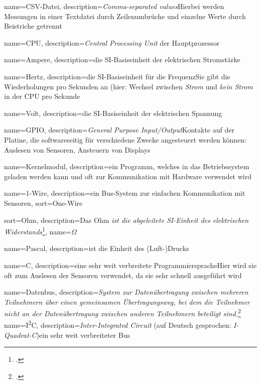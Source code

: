 {
  name=CSV-Datei,
  description={\textit{Comma-separated values}\newline Hierbei werden Messungen in einer Textdatei durch Zeilenumbrüche und einzelne Werte durch Beistriche getrennt}
}

{
  name=CPU,
  description={\textit{Central Processing Unit}\newline
  	der Hauptprozessor}
}

{
  name=Ampere,
  description={die SI-Basiseinheit der elektrischen Stromstärke}
}

{
  name=Hertz,
  description={die SI-Basiseinheit für die Frequenz\newline Sie gibt die Wiederholungen pro Sekunden an (hier: Wechsel zwischen \emph{Strom} und \emph{kein Strom} in der \gls{CPU} pro Sekunde}
}

{
  name=Volt,
  description={die SI-Basiseinheit der elektrischen Spannung}
}

{
  name=GPIO,
  description={\emph{General Purpose Input/Output}\newline Kontakte auf der Platine, die softwareseitig für verschiedene Zwecke angesteuert werden können\newline \zB: Auslesen von Sensoren, Ansteuern von Displays}
}

{
  name=Kernelmodul,
  description={ein Programm, welches in das Betriebssystem geladen werden kann und oft zur Kommunikation mit Hardware verwendet wird}
}

{
  name=1-Wire,
  description={ein \gls{Bus}-System zur einfachen Kommunikation mit Sensoren},
  sort=One-Wire
}

{
  sort=Ohm,
  description={Das Ohm \emph{ist die abgeleitete SI-Einheit des elektrischen Widerstands}\footcite{wiki:ohm}},
  name={\ensuremath{\Omega}}
}

{
  name=Pascal,
  description={ist die Einheit des (Luft-)Drucks}
}


{
  name=C,
  description={eine sehr weit verbreitete Programmiersprache\newline Hier wird sie oft zum Auslesen der Sensoren verwendet, da sie sehr schnell ausgeführt wird}
}

{
  name=Datenbus,
  description={\emph{System zur Datenübertragung zwischen mehreren Teilnehmern über einen gemeinsamen Übertragungsweg, bei dem die Teilnehmer nicht an der Datenübertragung zwischen anderen Teilnehmern beteiligt sind.}\footcite{wiki:bus}}
}
{
  name=I\textsuperscript{2}C,
  description={\textit{Inter-Integrated Circuit} (auf Deutsch gesprochen: \textit{I-Quadrat-C})\newline ein sehr weit verbreiteter \gls{Bus}}
}

